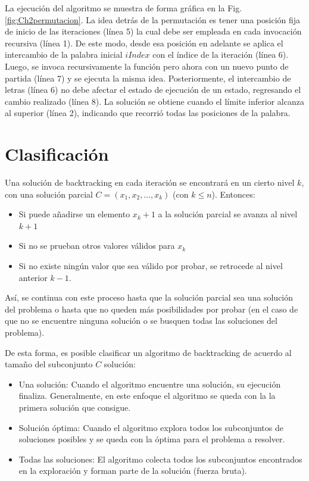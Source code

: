 La ejecución del algoritmo se muestra de forma gráfica en la Fig. \ref{fig:Ch2permutacion}. La idea detrás de la permutación es tener una posición fija de inicio de las iteraciones (línea 5) la cual debe ser empleada en cada invocación recursiva (línea 1). De este modo, desde esa posición en adelante se aplica el intercambio de la palabra inicial $iIndex$ con el índice de la iteración (línea 6). Luego, se invoca recursivamente la función pero ahora con un nuevo punto de partida (línea 7) y se ejecuta la misma idea. Posteriormente, el intercambio de letras (línea 6) no debe afectar el estado de ejecución de un estado, regresando el cambio realizado (línea 8). La solución se obtiene cuando el límite inferior alcanza al superior (línea 2), indicando que recorrió todas las posiciones de la palabra.


\section{Clasificación}

Una solución de backtracking en cada iteración se encontrará en un cierto nivel $k$, con una solución parcial $C = (x_1, x_2, ..., x_k)$ (con $k \le n$). Entonces:
\begin{itemize}
\item Si puede añadirse un elemento $x_k + 1$ a la solución parcial se avanza al nivel $k + 1$
\item Si no se prueban otros valores válidos para $x_k$
\item Si no existe ningún valor que sea válido por probar, se retrocede al nivel anterior $k - 1$.
\end{itemize}
Así, se continua con este proceso hasta que la solución parcial sea una solución del problema o hasta que no queden más posibilidades por probar (en el caso de que no se encuentre ninguna solución o se busquen todas las soluciones del problema).

De esta forma, es posible clasificar un algoritmo de backtracking de acuerdo al tamaño del subconjunto $C$ solución:
\begin{itemize}
\item Una solución: Cuando el algoritmo encuentre una solución, su ejecución finaliza. Generalmente, en este enfoque el algoritmo se queda con la la primera solución que consigue.
\item Solución óptima: Cuando el algoritmo explora todos los subconjuntos de soluciones posibles y se queda con la óptima para el problema a resolver.
\item Todas las soluciones: El algoritmo colecta todos los subconjuntos encontrados en la exploración y forman parte de la solución (fuerza bruta).
\end{itemize}


